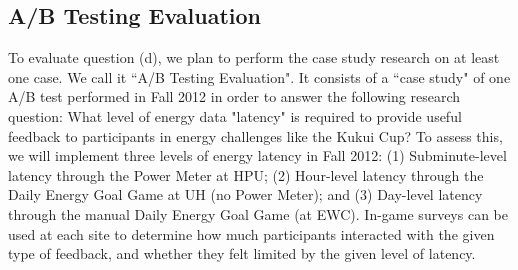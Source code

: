 \documentclass[11pt,final]{article}
\begin{document}
\subsection{A/B Testing Evaluation}
To evaluate question (d), we plan to perform the case study research on at least one case. We call it ``A/B Testing Evaluation". It consists of a ``case study" of one A/B test performed in Fall 2012 in order to answer the following research question: What level of energy data "latency" is required to provide useful feedback to participants in energy challenges like the Kukui Cup?  To assess this, we will implement three levels of energy latency in Fall 2012:  (1) Subminute-level latency through the Power Meter at HPU; (2) Hour-level latency through the Daily Energy Goal Game at UH (no Power Meter); and (3) Day-level latency through the manual Daily Energy Goal Game (at EWC).  In-game surveys can be used at each site to determine how much participants interacted with the given type of feedback, and whether they felt limited by the given level of latency.
  
\end{document}
